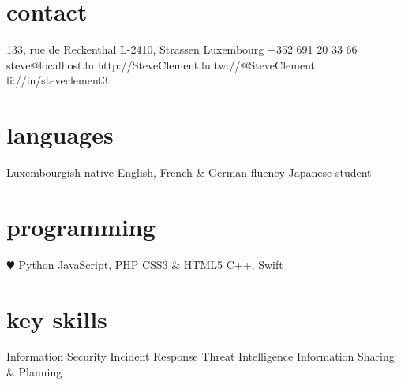 \documentclass[]{friggeri-cv} %
\begin{document}


\begin{aside} %
\section{contact}
133, rue de Reckenthal
L-2410, Strassen
Luxembourg
+352 691 20 33 66
{steve@localhost.lu}
{http://SteveClement.lu}
{tw://@SteveClement}
{li://in/steveclement3}
\section{languages}
Luxembourgish native
English, French \& German fluency
Japanese student
\section{programming}
{\color{red} $\varheartsuit$} Python
JavaScript, PHP
CSS3 \& HTML5
C++, Swift
\section{key skills}
Information Security
Incident Response
Threat Intelligence
Information Sharing \& Planning
\end{aside}

\end{document}
